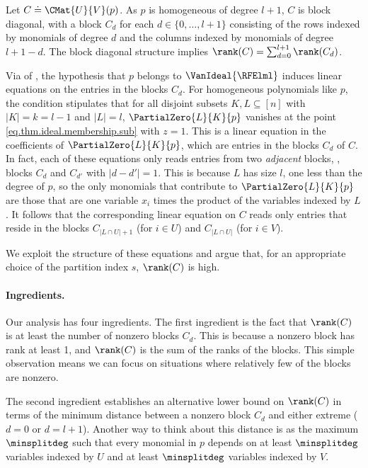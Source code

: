 \documentclass{toc}
\begin{document}
Let $C \doteq \CMat{U}{V}(p)$.
As $p$ is homogeneous of degree $l+1$,
\(C\) is block diagonal,
with a block \(C_d\) for each \(d \in \{0,\ldots,l+1\}\)
consisting of the rows indexed by monomials of degree \(d\)
and the columns indexed by monomials of degree \(l+1-d\).
The block diagonal structure implies $\rank(C) = \sum_{d=0}^{l+1} \rank(C_d)$.

Via  of , the hypothesis that \(p\) belongs to \(\VanIdeal{\RFElml}\) induces linear equations on the entries in the blocks \(C_d\). For homogeneous polynomials like $p$, the condition stipulates that for all disjoint subsets $K,L \subseteq [n]$ with $|K| = k = l-1$ and $|L| = l$, \(\PartialZero{L}{K}{p}\) vanishes at the point \eqref{eq.thm.ideal.membership.sub} with $z=1$. This is a linear equation in the coefficients of \(\PartialZero{L}{K}{p}\), which are entries in the blocks $C_d$ of $C$. In fact, each of these equations only reads entries from two \emph{adjacent} blocks, \ie, blocks $C_d$ and $C_{d'}$ with \(|d - d'| = 1\). This is because \(L\) has size \(l\), one less than the degree of \(p\), so the only monomials that contribute to $\PartialZero{L}{K}{p}$ are those that are one variable \(x_i\) times the product of the variables indexed by \(L\). It follows that the corresponding linear equation on \(C\) reads only entries that reside in the blocks $C_{|L \cap U|+1}$ (for $i \in U$) and $C_{|L\cap U|}$ (for $i \in V$).

We exploit the structure of these equations and argue that, for an appropriate choice of the partition index $s$, $\rank(C)$ is high. 

\paragraph{Ingredients.}
Our analysis has four ingredients.
The first ingredient is the fact that $\rank(C)$ is at least the number of nonzero blocks $C_d$. This is because a nonzero block has rank at least 1, and $\rank(C)$ is the sum of the ranks of the blocks. This simple observation means we can focus on situations where relatively few of the blocks are nonzero.

The second ingredient establishes an alternative lower bound on \(\rank(C)\) in terms of the minimum distance between a nonzero block \(C_d\) and either extreme (\(d=0\) or \(d=l+1\)). Another way to think about this distance is as the maximum \(\minsplitdeg\) such that every monomial in \(p\) depends on at least \(\minsplitdeg\) variables indexed by \(U\) and at least \(\minsplitdeg\) variables indexed by \(V\).
\end{document}
